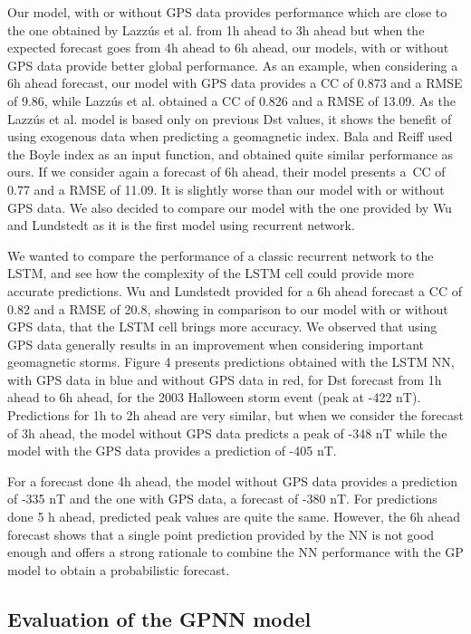 Our model, with or without GPS data provides performance which are close to the one obtained by 
Lazzús et al. \citet{Lazzus} from 1h ahead to 3h ahead but when the expected forecast goes from 4h ahead to 6h ahead, 
our models, with or without GPS data provide better global performance. As an example, when considering a 6h 
ahead forecast, our model with GPS data provides a CC of 0.873 and a RMSE of 9.86, while Lazzús et al. \citet{Lazzus} 
obtained a CC of 0.826 and a RMSE of 13.09. As the Lazzús et al. \citet{Lazzus} model is based only on 
previous Dst values, it shows the benefit of using exogenous data when predicting a geomagnetic index. 
Bala and Reiff \citet{Bala2012} used the Boyle index as an input function, and obtained quite similar 
performance as ours. If we consider again a forecast of 6h ahead, their model presents a\ CC of 0.77 
and a RMSE of 11.09. It is slightly worse than our model with or without GPS data. We also decided to compare 
our model with the one provided by Wu and Lundstedt \citet{wu1997geomagnetic} as it is the first model using 
recurrent network. 

We wanted to compare the performance of a classic recurrent network to the LSTM, and see 
how the complexity of the LSTM cell could provide more accurate predictions. Wu and Lundstedt \citet{wu1997geomagnetic} 
provided for a 6h ahead forecast a CC of 0.82 and a RMSE of 20.8, showing in comparison to our model with or 
without GPS data, that the LSTM cell brings more accuracy. We observed that using GPS data generally results 
in an improvement when considering important geomagnetic storms. Figure 4 presents predictions obtained with 
the LSTM NN, with GPS data in blue and without GPS data in red, for Dst forecast from 1h ahead to 6h ahead, 
for the 2003 Halloween storm event (peak at -422 nT). Predictions for 1h to 2h ahead are very similar, but when 
we consider the forecast of 3h ahead, the model without GPS data predicts a peak of -348 nT while the model 
with the GPS data provides a prediction of -405 nT. 

For a forecast done 4h ahead, the model without GPS data 
provides a prediction of -335 nT and the one with GPS data, a forecast of -380 nT. For predictions done 5 h ahead, 
predicted peak values are quite the same. However, the 6h ahead forecast shows that a single point prediction 
provided by the NN is not good enough and offers a strong rationale to combine the NN performance with the 
GP model to obtain a probabilistic forecast. 


\subsection{Evaluation of the GPNN model}

